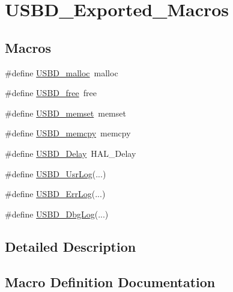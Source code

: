 \hypertarget{group__USBD__Exported__Macros}{}\section{U\+S\+B\+D\+\_\+\+Exported\+\_\+\+Macros}
\label{group__USBD__Exported__Macros}
\subsection*{Macros}
\begin{DoxyCompactItemize}
\item 
\#define \hyperlink{group__USBD__Exported__Macros_ga35ff353194f56823357f503e546ccf4b}{U\+S\+B\+D\+\_\+malloc}~malloc
\item 
\#define \hyperlink{group__USBD__Exported__Macros_gab44fcf9b4d7bfbe8b1308eca76975fe5}{U\+S\+B\+D\+\_\+free}~free
\item 
\#define \hyperlink{group__USBD__Exported__Macros_gaf7b31857d15ef0abbd84e0e70a2b903f}{U\+S\+B\+D\+\_\+memset}~memset
\item 
\#define \hyperlink{group__USBD__Exported__Macros_ga18d9c17ef2afe7244b559ed428ca1e81}{U\+S\+B\+D\+\_\+memcpy}~memcpy
\item 
\#define \hyperlink{group__USBD__Exported__Macros_ga78993b66136329032c26d0c13a78e963}{U\+S\+B\+D\+\_\+\+Delay}~H\+A\+L\+\_\+\+Delay
\item 
\#define \hyperlink{group__USBD__Exported__Macros_gad0adad09bbf4f06418659a39edc0f6c6}{U\+S\+B\+D\+\_\+\+Usr\+Log}(...)
\item 
\#define \hyperlink{group__USBD__Exported__Macros_ga077a76b66987212e70c3c4db2ca73a8b}{U\+S\+B\+D\+\_\+\+Err\+Log}(...)
\item 
\#define \hyperlink{group__USBD__Exported__Macros_ga009d0ba418c356a4668fac6115b07ac5}{U\+S\+B\+D\+\_\+\+Dbg\+Log}(...)
\end{DoxyCompactItemize}


\subsection{Detailed Description}


\subsection{Macro Definition Documentation}
\mbox{\label{group__USBD__Exported__Macros_ga009d0ba418c356a4668fac6115b07ac5}} 
